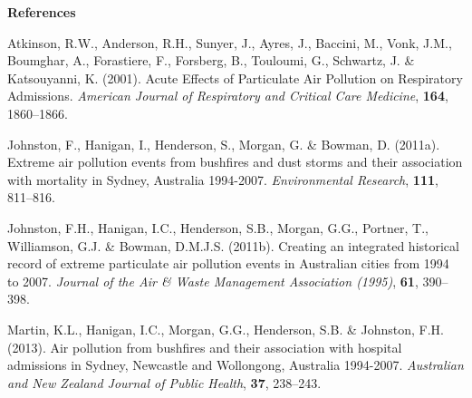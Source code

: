 \noindent \textbf{References}

Atkinson, R.W., Anderson, R.H., Sunyer, J., Ayres, J., Baccini, M.,
Vonk, J.M., Boumghar, A., Forastiere, F., Forsberg, B., Touloumi, G.,
Schwartz, J. \& Katsouyanni, K. (2001). Acute Effects of Particulate Air
Pollution on Respiratory Admissions. \emph{American Journal of
Respiratory and Critical Care Medicine}, \textbf{164}, 1860--1866.

Johnston, F., Hanigan, I., Henderson, S., Morgan, G. \& Bowman, D.
(2011a). Extreme air pollution events from bushfires and dust storms and
their association with mortality in Sydney, Australia 1994-2007.
\emph{Environmental Research}, \textbf{111}, 811--816.

Johnston, F.H., Hanigan, I.C., Henderson, S.B., Morgan, G.G., Portner,
T., Williamson, G.J. \& Bowman, D.M.J.S. (2011b). Creating an integrated
historical record of extreme particulate air pollution events in
Australian cities from 1994 to 2007. \emph{Journal of the Air \& Waste
Management Association (1995)}, \textbf{61}, 390--398.

Martin, K.L., Hanigan, I.C., Morgan, G.G., Henderson, S.B. \& Johnston,
F.H. (2013). Air pollution from bushfires and their association with
hospital admissions in Sydney, Newcastle and Wollongong, Australia
1994-2007. \emph{Australian and New Zealand Journal of Public Health},
\textbf{37}, 238--243.

